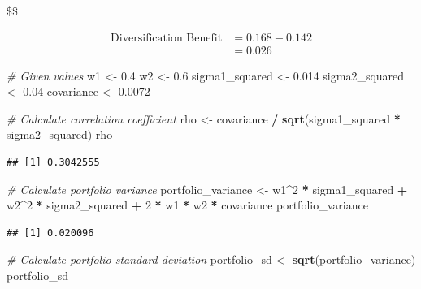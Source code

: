 \documentclass[
]{book}
\newenvironment{Shaded}{\begin{snugshade}}{\end{snugshade}}
\newcommand{\CommentTok}[1]{\textcolor[rgb]{0.56,0.35,0.01}{\textit{#1}}}
\newcommand{\DecValTok}[1]{\textcolor[rgb]{0.00,0.00,0.81}{#1}}
\newcommand{\FloatTok}[1]{\textcolor[rgb]{0.00,0.00,0.81}{#1}}
\newcommand{\FunctionTok}[1]{\textcolor[rgb]{0.13,0.29,0.53}{\textbf{#1}}}
\newcommand{\NormalTok}[1]{#1}
\newcommand{\OtherTok}[1]{\textcolor[rgb]{0.56,0.35,0.01}{#1}}
\newcommand{\SpecialCharTok}[1]{\textcolor[rgb]{0.81,0.36,0.00}{\textbf{#1}}}
\begin{document}
\$\$

\[
\begin{aligned} 
\text{Diversification Benefit}
            &= 0.168 - 0.142 \\
            &= 0.026 
\end{aligned}
\]

\begin{Shaded}
\begin{Highlighting}[]
\CommentTok{\# Given values}
\NormalTok{w1 }\OtherTok{\textless{}{-}} \FloatTok{0.4}
\NormalTok{w2 }\OtherTok{\textless{}{-}} \FloatTok{0.6}
\NormalTok{sigma1\_squared }\OtherTok{\textless{}{-}} \FloatTok{0.014}
\NormalTok{sigma2\_squared }\OtherTok{\textless{}{-}} \FloatTok{0.04}
\NormalTok{covariance }\OtherTok{\textless{}{-}} \FloatTok{0.0072}

\CommentTok{\# Calculate correlation coefficient}
\NormalTok{rho }\OtherTok{\textless{}{-}}\NormalTok{ covariance }\SpecialCharTok{/} \FunctionTok{sqrt}\NormalTok{(sigma1\_squared }\SpecialCharTok{*}\NormalTok{ sigma2\_squared)}
\NormalTok{rho }
\end{Highlighting}
\end{Shaded}

\begin{verbatim}
## [1] 0.3042555
\end{verbatim}

\begin{Shaded}
\begin{Highlighting}[]
\CommentTok{\# Calculate portfolio variance}
\NormalTok{portfolio\_variance }\OtherTok{\textless{}{-}}\NormalTok{ w1}\SpecialCharTok{\^{}}\DecValTok{2} \SpecialCharTok{*}\NormalTok{ sigma1\_squared }\SpecialCharTok{+}\NormalTok{ w2}\SpecialCharTok{\^{}}\DecValTok{2} \SpecialCharTok{*}\NormalTok{ sigma2\_squared }\SpecialCharTok{+} \DecValTok{2} \SpecialCharTok{*}\NormalTok{ w1 }\SpecialCharTok{*}\NormalTok{ w2 }\SpecialCharTok{*}\NormalTok{ covariance}
\NormalTok{portfolio\_variance}
\end{Highlighting}
\end{Shaded}

\begin{verbatim}
## [1] 0.020096
\end{verbatim}

\begin{Shaded}
\begin{Highlighting}[]
\CommentTok{\# Calculate portfolio standard deviation}
\NormalTok{portfolio\_sd }\OtherTok{\textless{}{-}} \FunctionTok{sqrt}\NormalTok{(portfolio\_variance)}
\NormalTok{portfolio\_sd}
\end{Highlighting}
\end{Shaded}
\end{document}
